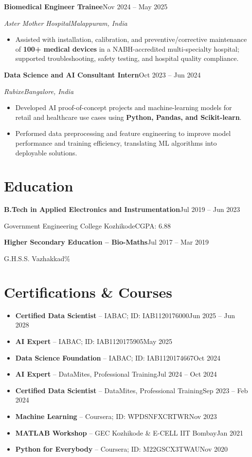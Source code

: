 \documentclass[11pt,letterpaper]{article}
\newcommand{\role}[4]{%
    \vspace{2pt}\noindent\textbf{#1}\hfill #2\par
    \textit{#3}\hfill\textit{#4}\par\vspace{1pt}%
}
\newcommand{\qualification}[3]{%
    \noindent\textbf{#1}\hfill #2\par
    #3\par\vspace{2pt}%
}
\newcommand{\credential}[2]{\item #1\hfill #2}
\begin{document}
\vspace{4pt}
\role{Biomedical Engineer Trainee}{Nov 2024 -- May 2025}{Aster Mother Hospital}{Malappuram, India}
\begin{itemize}[itemsep=1pt]
    \item Assisted with installation, calibration, and preventive/corrective maintenance of \textbf{100+ medical devices} in a NABH-accredited multi-specialty hospital; supported troubleshooting, safety testing, and hospital quality compliance.
\end{itemize}

\vspace{4pt}
\role{Data Science and AI Consultant Intern}{Oct 2023 -- Jun 2024}{Rubixe}{Bangalore, India}
\begin{itemize}[itemsep=1pt]
    \item Developed AI proof-of-concept projects and machine-learning models for retail and healthcare use cases using \textbf{Python, Pandas, and Scikit-learn}.
    \item Performed data preprocessing and feature engineering to improve model performance and training efficiency, translating ML algorithms into deployable solutions.
\end{itemize}

\section{Education}
\qualification{B.Tech in Applied Electronics and Instrumentation}{Jul 2019 -- Jun 2023}{Government Engineering College Kozhikode\enspace\textbar\enspace CGPA: 6.88}
\qualification{Higher Secondary Education -- Bio-Maths}{Jul 2017 -- Mar 2019}{G.H.S.S. Vazhakkad\enspace\textbar\enspace 91\%}

\section{Certifications \& Courses}
{\small
\begin{itemize}[itemsep=1pt]
    \credential{\textbf{Certified Data Scientist} -- IABAC; ID: IAB1120176000}{Jun 2025 -- Jun 2028}
    \credential{\textbf{AI Expert} -- IABAC; ID: IAB1120175905}{May 2025}
    \credential{\textbf{Data Science Foundation} -- IABAC; ID: IAB1120174667}{Oct 2024}
    \credential{\textbf{AI Expert} -- DataMites, Professional Training}{Jul 2024 -- Oct 2024}
    \credential{\textbf{Certified Data Scientist} -- DataMites, Professional Training}{Sep 2023 -- Feb 2024}
    \credential{\textbf{Machine Learning} -- Coursera; ID: WPDSNFXCRTWR}{Nov 2023}
    \credential{\textbf{MATLAB Workshop} -- GEC Kozhikode \& E-CELL IIT Bombay}{Jan 2021}
    \credential{\textbf{Python for Everybody} -- Coursera; ID: M22GSCX3TWAU}{Nov 2020}
\end{itemize}
}
\end{document}

